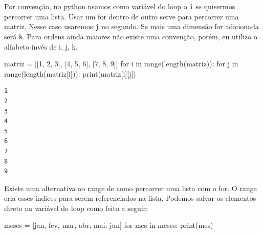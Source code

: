 \documentclass[
  letterpaper,
  DIV=11,
  numbers=noendperiod]{scrreprt}
\newenvironment{Shaded}{\begin{snugshade}}{\end{snugshade}}
\newcommand{\BuiltInTok}[1]{\textcolor[rgb]{0.00,0.23,0.31}{#1}}
\newcommand{\ControlFlowTok}[1]{\textcolor[rgb]{0.00,0.23,0.31}{#1}}
\newcommand{\DecValTok}[1]{\textcolor[rgb]{0.68,0.00,0.00}{#1}}
\newcommand{\KeywordTok}[1]{\textcolor[rgb]{0.00,0.23,0.31}{#1}}
\newcommand{\NormalTok}[1]{\textcolor[rgb]{0.00,0.23,0.31}{#1}}
\newcommand{\OperatorTok}[1]{\textcolor[rgb]{0.37,0.37,0.37}{#1}}
\newcommand{\StringTok}[1]{\textcolor[rgb]{0.13,0.47,0.30}{#1}}
\begin{document}
Por convenção, no python usamos como variável do loop o \texttt{i} se
quisermos percorrer uma lista. Usar um for dentro de outro serve para
percorrer uma matriz. Nesse caso usaremos \texttt{j} no segundo. Se mais
uma dimensão for adicionada será \texttt{k}. Para ordens ainda maiores
não existe uma convenção, porém, eu utilizo o alfabeto invés de i, j, k.

\begin{Shaded}
\begin{Highlighting}[]
\NormalTok{matriz }\OperatorTok{=}\NormalTok{ [[}\DecValTok{1}\NormalTok{, }\DecValTok{2}\NormalTok{, }\DecValTok{3}\NormalTok{], [}\DecValTok{4}\NormalTok{, }\DecValTok{5}\NormalTok{, }\DecValTok{6}\NormalTok{], [}\DecValTok{7}\NormalTok{, }\DecValTok{8}\NormalTok{, }\DecValTok{9}\NormalTok{]]}
\ControlFlowTok{for}\NormalTok{ i }\KeywordTok{in} \BuiltInTok{range}\NormalTok{(length(matriz)):}
    \ControlFlowTok{for}\NormalTok{ j }\KeywordTok{in} \BuiltInTok{range}\NormalTok{(length(matriz[i])):}
        \BuiltInTok{print}\NormalTok{(matriz[i][j])}
\end{Highlighting}
\end{Shaded}

\begin{tcolorbox}[enhanced jigsaw, breakable, leftrule=.75mm, left=2mm, opacityback=0, bottomrule=.15mm, toprule=.15mm, rightrule=.15mm, arc=.35mm, colback=white]

\begin{verbatim}
1
2
3
4
5
6
7
8
9
\end{verbatim}

\end{tcolorbox}

Existe uma alternativa ao range de como percorrer uma lista com o for. O
range cria esses índices para serem referenciados na lista. Podemos
salvar os elementos direto na variável do loop como feito a seguir:

\begin{Shaded}
\begin{Highlighting}[]
\NormalTok{meses }\OperatorTok{=}\NormalTok{ [}\StringTok{\textquotesingle{}jan\textquotesingle{}}\NormalTok{, }\StringTok{\textquotesingle{}fev\textquotesingle{}}\NormalTok{, }\StringTok{\textquotesingle{}mar\textquotesingle{}}\NormalTok{, }\StringTok{\textquotesingle{}abr\textquotesingle{}}\NormalTok{, }\StringTok{\textquotesingle{}mai\textquotesingle{}}\NormalTok{, }\StringTok{\textquotesingle{}jun\textquotesingle{}}\NormalTok{]}
\ControlFlowTok{for}\NormalTok{ mes }\KeywordTok{in}\NormalTok{ meses:}
    \BuiltInTok{print}\NormalTok{(mes)}
\end{Highlighting}
\end{Shaded}
\end{document}

